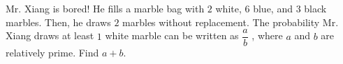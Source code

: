 Mr. Xiang is bored! He fills a marble bag with $2$ white, $6$ blue, and $3$ black marbles. Then, he draws $2$ marbles without replacement. The probability Mr. Xiang draws at least $1$ white marble can be written as $\dfrac{a}{b}$ , where $a$ and $b$ are relatively prime. Find $a + b$.
